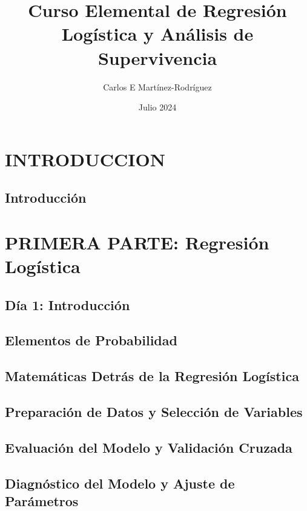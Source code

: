 \documentclass{report}
\title{Curso Elemental de Regresi\'on Logística y Análisis de Supervivencia}
\author{Carlos E Mart\'inez-Rodr\'iguez}
\date{Julio 2024}
\begin{document}
\maketitle

\tableofcontents

\part{INTRODUCCION}
\chapter{Introducci\'on}







\part{PRIMERA PARTE: Regresi\'on Log\'istica}


\chapter{D\'ia 1: Introducci\'on}


\chapter{Elementos de Probabilidad}


\chapter{Matem\'aticas Detr\'as de la Regresi\'on Logística}


\chapter{Preparaci\'on de Datos y Selecci\'on de Variables}


\chapter{Evaluaci\'on del Modelo y Validaci\'on Cruzada}


\chapter{Diagn\'ostico del Modelo y Ajuste de Par\'ametros}

\end{document}
